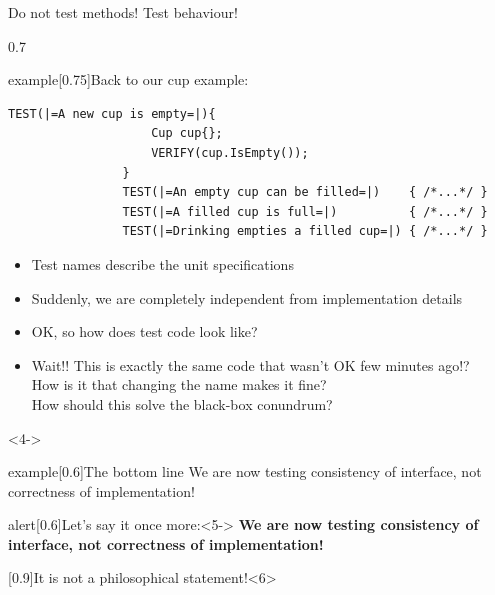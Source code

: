 \begin{frame}[fragile]{Do not test methods! Test behaviour!}
\begin{overlayarea}{\textwidth}{0.7\textheight}
\begin{varblock}{example}[0.75\textwidth]{Back to our cup example:}
\begin{lstlisting}[style=MyCpp]
                TEST(|=A new cup is empty=|){
                    Cup cup{};
                    VERIFY(cup.IsEmpty());
                }
                TEST(|=An empty cup can be filled=|)    { /*...*/ }
                TEST(|=A filled cup is full=|)          { /*...*/ }
                TEST(|=Drinking empties a filled cup=|) { /*...*/ }
            \end{lstlisting}
        \end{varblock}
        \begin{itemize}
            \item<only@1> Test names describe the unit specifications
            \item<only@1> Suddenly, we are completely independent from implementation details
            \item<only@1> OK, so how does test code look like?
            \item<only@3> \alert{Wait!! This is exactly the same code that wasn't OK few minutes ago!?}\\
            \then How is it that changing the name makes it fine?\\
            \then How should this solve the black-box conundrum?
        \end{itemize}
        \begin{onlyenv}<4->
            \begin{varblock}{example}[0.6\textwidth]{The bottom line}
                We are now testing consistency of interface, not correctness of implementation!
            \end{varblock}
            \begin{varblock}{alert}[0.6\textwidth]{Let's say it once more:}<5->
                \textbf{We are now testing consistency of interface, not correctness of implementation!}
            \end{varblock}
            \begin{varblock}{}[0.9\textwidth]{It is not a philosophical statement!}<6>
            \end{varblock}
        \end{onlyenv}
    \end{overlayarea}
\end{frame}
